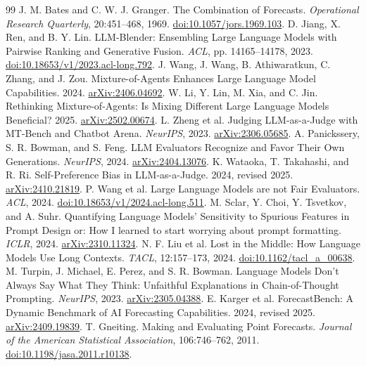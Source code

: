 \documentclass[11pt]{article}
\begin{document}
\begin{thebibliography}{99}\small
{} J. M. Bates and C. W. J. Granger. The Combination of Forecasts. \emph{Operational Research Quarterly}, 20:451--468, 1969. \href{https://doi.org/10.1057/jors.1969.103}{doi:10.1057/jors.1969.103}.
 D. Jiang, X. Ren, and B. Y. Lin. LLM-Blender: Ensembling Large Language Models with Pairwise Ranking and Generative Fusion. \emph{ACL}, pp. 14165--14178, 2023. \href{https://aclanthology.org/2023.acl-long.792/}{doi:10.18653/v1/2023.acl-long.792}.
 J. Wang, J. Wang, B. Athiwaratkun, C. Zhang, and J. Zou. Mixture-of-Agents Enhances Large Language Model Capabilities. 2024. \href{https://arxiv.org/abs/2406.04692}{arXiv:2406.04692}.
 W. Li, Y. Lin, M. Xia, and C. Jin. Rethinking Mixture-of-Agents: Is Mixing Different Large Language Models Beneficial? 2025. \href{https://arxiv.org/abs/2502.00674}{arXiv:2502.00674}.
 L. Zheng et al. Judging LLM-as-a-Judge with MT-Bench and Chatbot Arena. \emph{NeurIPS}, 2023. \href{https://arxiv.org/abs/2306.05685}{arXiv:2306.05685}.
 A. Panickssery, S. R. Bowman, and S. Feng. LLM Evaluators Recognize and Favor Their Own Generations. \emph{NeurIPS}, 2024. \href{https://arxiv.org/abs/2404.13076}{arXiv:2404.13076}.
 K. Wataoka, T. Takahashi, and R. Ri. Self-Preference Bias in LLM-as-a-Judge. 2024, revised 2025. \href{https://arxiv.org/abs/2410.21819}{arXiv:2410.21819}.
 P. Wang et al. Large Language Models are not Fair Evaluators. \emph{ACL}, 2024. \href{https://aclanthology.org/2024.acl-long.511/}{doi:10.18653/v1/2024.acl-long.511}.
 M. Sclar, Y. Choi, Y. Tsvetkov, and A. Suhr. Quantifying Language Models' Sensitivity to Spurious Features in Prompt Design or: How I learned to start worrying about prompt formatting. \emph{ICLR}, 2024. \href{https://arxiv.org/abs/2310.11324}{arXiv:2310.11324}.
 N. F. Liu et al. Lost in the Middle: How Language Models Use Long Contexts. \emph{TACL}, 12:157--173, 2024. \href{https://aclanthology.org/2024.tacl-1.9/}{doi:10.1162/tacl\_a\_00638}.
 M. Turpin, J. Michael, E. Perez, and S. R. Bowman. Language Models Don't Always Say What They Think: Unfaithful Explanations in Chain-of-Thought Prompting. \emph{NeurIPS}, 2023. \href{https://arxiv.org/abs/2305.04388}{arXiv:2305.04388}.
 E. Karger et al. ForecastBench: A Dynamic Benchmark of AI Forecasting Capabilities. 2024, revised 2025. \href{https://arxiv.org/abs/2409.19839}{arXiv:2409.19839}.
 T. Gneiting. Making and Evaluating Point Forecasts. \emph{Journal of the American Statistical Association}, 106:746--762, 2011. \href{https://doi.org/10.1198/jasa.2011.r10138}{doi:10.1198/jasa.2011.r10138}.
\end{thebibliography}
\end{document}
